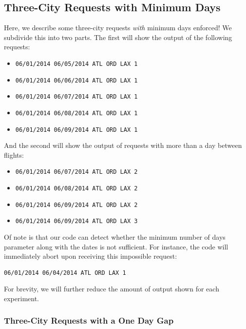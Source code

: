\documentclass{article}
\begin{document}
\subsection{Three-City Requests with Minimum Days}\label{app:three-city-mindays}

Here, we describe some three-city requests \emph{with} minimum days enforced! We subdivide this into two parts. The first will show the output of the
following requests:

\begin{itemize}[noitemsep]
    \item \texttt{06/01/2014 06/05/2014 ATL ORD LAX 1}
    \item \texttt{06/01/2014 06/06/2014 ATL ORD LAX 1}
    \item \texttt{06/01/2014 06/07/2014 ATL ORD LAX 1}
    \item \texttt{06/01/2014 06/08/2014 ATL ORD LAX 1}
    \item \texttt{06/01/2014 06/09/2014 ATL ORD LAX 1}
\end{itemize}

And the second will show the output of requests with more than a day between flights:

\begin{itemize}[noitemsep]
    \item \texttt{06/01/2014 06/07/2014 ATL ORD LAX 2}
    \item \texttt{06/01/2014 06/08/2014 ATL ORD LAX 2}
    \item \texttt{06/01/2014 06/09/2014 ATL ORD LAX 2}
    \item \texttt{06/01/2014 06/09/2014 ATL ORD LAX 3}
\end{itemize}

Of note is that our code can detect whether the minimum number of days parameter along with the dates is not sufficient. For instance, the code will
immediately abort upon receiving this impossible request:

\begin{verbatim}
06/01/2014 06/04/2014 ATL ORD LAX 1
\end{verbatim}

For brevity, we will further reduce the amount of output shown for each experiment.

\subsubsection{Three-City Requests with a One Day Gap}
\end{document}
